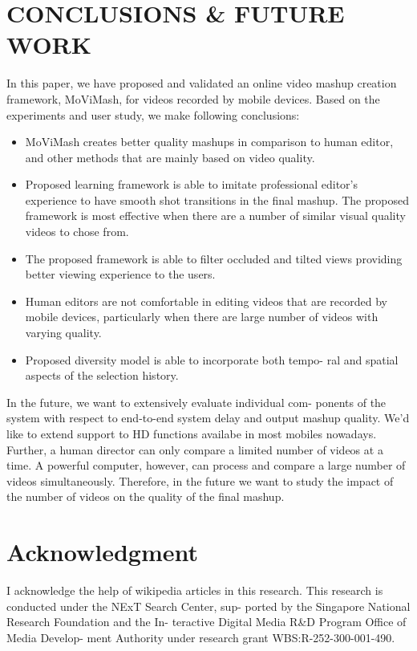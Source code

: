 \documentclass{sig-alternate}
\begin{document}
\section{CONCLUSIONS \& FUTURE WORK}
In this paper, we have proposed and validated an online video
mashup creation framework, MoViMash, for videos recorded by
mobile devices. Based on the experiments and user study, we make
following conclusions:
\begin{itemize}
    \item MoViMash creates better quality mashups in comparison to
human editor, and other methods that are mainly based on
video quality.
    \item Proposed learning framework is able to imitate professional
editor’s experience to have smooth shot transitions in the final mashup. The proposed framework is most effective when there are a number of similar visual quality videos to chose
from.
    \item The proposed framework is able to filter occluded and tilted
views providing better viewing experience to the users.
    \item Human editors are not comfortable in editing videos that are
recorded by mobile devices, particularly when there are large
number of videos with varying quality.
    \item Proposed diversity model is able to incorporate both tempo-
ral and spatial aspects of the selection history.
\end{itemize}
In the future, we want to extensively evaluate individual com-
ponents of the system with respect to end-to-end system delay and
output mashup quality. We'd like to extend support to HD functions availabe in most mobiles nowadays. Further, a human
director can only compare a limited number of videos at a time.
A powerful computer, however, can process and compare a large
number of videos simultaneously. Therefore, in the future we want
to study the impact of the number of videos on the quality of the
final mashup.
\section{Acknowledgment}
I acknowledge the help of wikipedia articles in this research.
This research is conducted under the NExT Search Center, sup-
ported by the Singapore National Research Foundation and the In-
teractive Digital Media R\&D Program Office of Media Develop-
ment Authority under research grant WBS:R-252-300-001-490.
\end{document}
